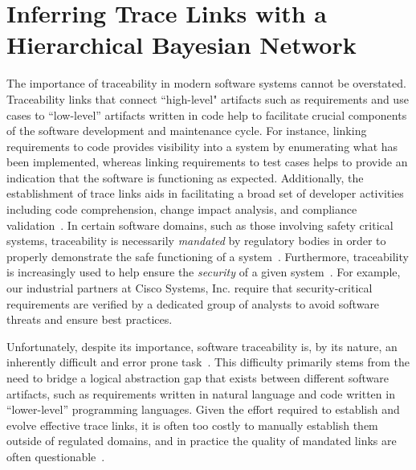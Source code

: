\chapter{Inferring Trace Links with \break a Hierarchical Bayesian Network}
\label{ch:hbn}


The importance of traceability in modern software systems cannot be overstated. Traceability links that connect ``high-level" artifacts such as requirements and use cases to ``low-level'' artifacts written in code help to facilitate crucial components of the software development and maintenance cycle. For instance, linking requirements to code provides visibility into a system by enumerating what has been implemented, whereas linking requirements to test cases helps to provide an indication that the software is functioning as expected. Additionally, the establishment of trace links aids in facilitating a broad set of developer activities including code comprehension, change impact analysis, and compliance validation~\citep{Cleland-Huang:Springer'12}.  In certain software domains, such as those involving safety critical systems, traceability is necessarily \textit{mandated} by regulatory bodies in order to properly demonstrate the safe functioning of a system~\citep{Nejati:IST'12,Rempel:ICSE'14,Cleland-Huang:ICSE'10,Mader:Soft'13}. Furthermore, traceability is increasingly used to help ensure the \textit{security} of a given system~\citep{Nhlabatsi:SST'15}. For example, our industrial partners at Cisco Systems, Inc. require that security-critical requirements are verified by a dedicated group of analysts to avoid software threats and ensure best practices. 

Unfortunately, despite its importance, software traceability is, by its nature, an inherently difficult and error prone task~\citep{Cleland-Huang:FOSE'14,Mahmoud:ICPC'12,Mader:Soft'13}. This difficulty primarily stems from the need to bridge a logical abstraction gap that exists between different software artifacts, such as requirements written in natural language and code written in ``lower-level'' programming languages.  %
Given the effort required to establish and evolve effective trace links, it is often too costly to manually establish them outside of regulated domains, and in practice the quality of mandated links are often questionable~\citep{Cleland-Huang:FSE'14}.  

